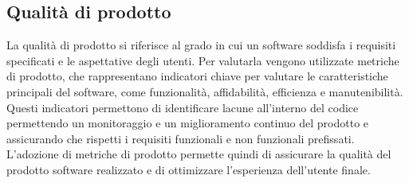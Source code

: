 \subsection{Qualità di prodotto}
La qualità di prodotto si riferisce al grado in cui un software soddisfa i requisiti specificati e le aspettative degli utenti.
Per valutarla vengono utilizzate metriche di prodotto, che rappresentano indicatori chiave per valutare le caratteristiche principali del software, come 
funzionalità, affidabilità, efficienza e manutenibilità.
Questi indicatori permettono di identificare lacune all'interno del codice permettendo un monitoraggio e un miglioramento continuo del prodotto
e assicurando che rispetti i requisiti funzionali e non funzionali prefissati.
L'adozione di metriche di prodotto permette quindi di assicurare la qualità del prodotto software realizzato e di ottimizzare l'esperienza 
dell'utente finale.